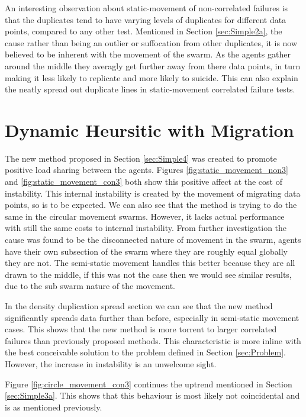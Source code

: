 \documentclass{UoYCSproject}
\begin{document}
An interesting observation about static-movement of non-correlated failures is that the duplicates tend to have varying levels of duplicates for different data points, compared to any other test. 
Mentioned in Section \ref{sec:Simple2a}, the cause rather than being an outlier or suffocation from other duplicates, it is now believed to be inherent with the movement of the swarm. 
As the agents gather around the middle they averagly get further away from there data points, in turn making it less likely to replicate and more likely to suicide. 
This can also explain the neatly spread out duplicate lines in static-movement correlated failure tests.

\section{Dynamic Heursitic with Migration}
\label{sec:Simple4a}

The new method proposed in Section \ref{sec:Simple4} was created to promote positive load sharing between the agents. 
Figures \ref{fig:static_movement_non3} and \ref{fig:static_movement_con3} both show this positive affect at the cost of instability. 
This internal instability is created by the movement of migrating data points, so is to be expected. 
We can also see that the method is trying to do the same in the circular movement swarms. 
However, it lacks actual performance with still the same costs to internal instability. 
From further investigation the cause was found to be the disconnected nature of movement in the swarm, agents have their own subsection of the swarm where they are roughly equal globally they are not. 
The semi-static movement handles this better because they are all drawn to the middle, if this was not the case then we would see similar results, due to the sub swarm nature of the movement.

In the density duplication spread section we can see that the new method significantly spreads data further than before, especially in semi-static movement cases. 
This shows that the new method is more torrent to larger correlated failures than previously proposed methods. 
This characteristic is more inline with the best conceivable solution to the problem defined in Section \ref{sec:Problem}. 
However, the increase in instability is an unwelcome sight.

Figure \ref{fig:circle_movement_con3} continues the uptrend mentioned in Section \ref{sec:Simple3a}. 
This shows that this behaviour is most likely not coincidental and is as mentioned previously.
\end{document}
